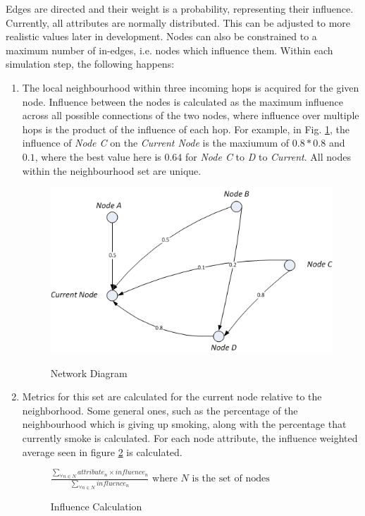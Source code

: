 \documentclass[]{article}
\begin{document}
Edges are directed and their weight is a probability, representing their influence.
Currently, all attributes are normally distributed. This can be adjusted to more realistic values later in development.
Nodes can also be constrained to a maximum number of in-edges, i.e. nodes which influence them. Within each simulation step, the following happens:
\begin{enumerate}
\item The local neighbourhood within three incoming hops is acquired for the given node. Influence between the nodes is calculated as the maximum influence across all possible connections of the two nodes, where influence over multiple hops is the product of the influence of each hop. For example, in Fig. \ref{networkdiag}, the influence of \emph{Node C} on the \emph{Current Node} is the maxiumum of $0.8 * 0.8$ and $0.1$, where the best value here is $0.64$ for \emph{Node C} to \emph{D} to \emph{Current}. All nodes within the neighbourhood set are unique.
\begin{figure}[h]
\begin{center}
\includegraphics{networkdiag.png}
\label{networkdiag}
\caption{Network Diagram}
\end{center}
\end{figure}

\item Metrics for this set are calculated for the current node relative to the neighborhood. Some general ones, such as the percentage of the neighbourhood which is giving up smoking, along with the percentage that currently smoke is calculated. For each node attribute, the influence weighted average seen in figure \ref{inf} is calculated.
\begin{figure}[h]
	\begin{center}
		\begin{math}
		\frac{\sum_{\forall n \in N} attribute_{n} \times influence_{n}}{\sum_{\forall n \in N} influence_{n}} \text{ where } N \text{ is the set of nodes}
		\end{math}
	\end{center}
	\label{inf}
	\caption{Influence Calculation}
\end{figure}



\end{enumerate}
\end{document}
